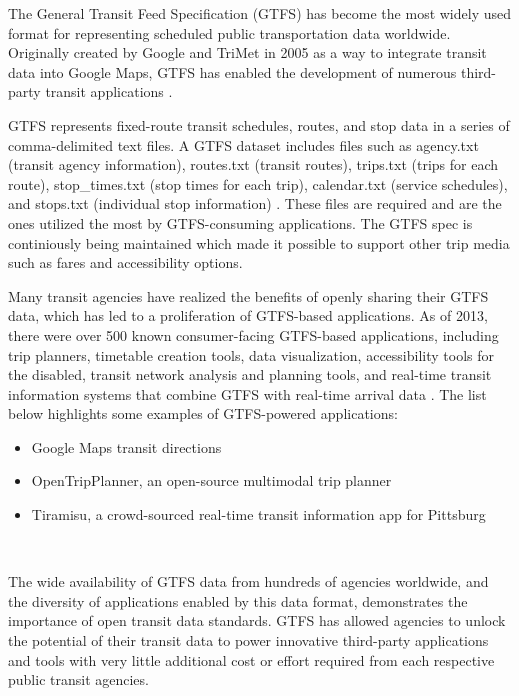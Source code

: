 \documentclass{icsthesis}
\begin{document}
\begin{mainmatter}
		The General Transit Feed Specification (GTFS) has become the most widely used format for representing scheduled public transportation data worldwide.
		Originally created by Google and TriMet in 2005 as a way to integrate transit data into Google Maps, GTFS has enabled the development of numerous third-party transit applications \cite{Antrim01}.
		
		GTFS represents fixed-route transit schedules, routes, and stop data in a series of comma-delimited text files.
		A GTFS dataset includes files such as agency.txt (transit agency information), routes.txt (transit routes), trips.txt (trips for each route), stop\_times.txt (stop times for each trip), calendar.txt (service schedules), and stops.txt (individual stop information) \cite{Antrim01}.
		These files are required and are the ones utilized the most by GTFS-consuming applications. The GTFS spec is continiously being maintained which made it possible to support other trip media such as fares and accessibility options.
		
		Many transit agencies have realized the benefits of openly sharing their GTFS data, which has led to a proliferation of GTFS-based applications.
		As of 2013, there were over 500 known consumer-facing GTFS-based applications, including trip planners, timetable creation tools, data visualization, accessibility tools for the disabled, transit network analysis and planning tools, and real-time transit information systems that combine GTFS with real-time arrival data \cite{Antrim01}.
		The list below highlights some examples of GTFS-powered applications:
		
		\begin{itemize}
			\item Google Maps transit directions
			\item OpenTripPlanner, an open-source multimodal trip planner
			\item Tiramisu, a crowd-sourced real-time transit information app for Pittsburg
		\end{itemize} \hfill \
		
		The wide availability of GTFS data from hundreds of agencies worldwide, and the diversity of applications enabled by this data format, demonstrates the importance of open transit data standards.
		GTFS has allowed agencies to unlock the potential of their transit data to power innovative third-party applications and tools with very little additional cost or effort required from each respective public transit agencies. 
		

\end{mainmatter}
\end{document}
